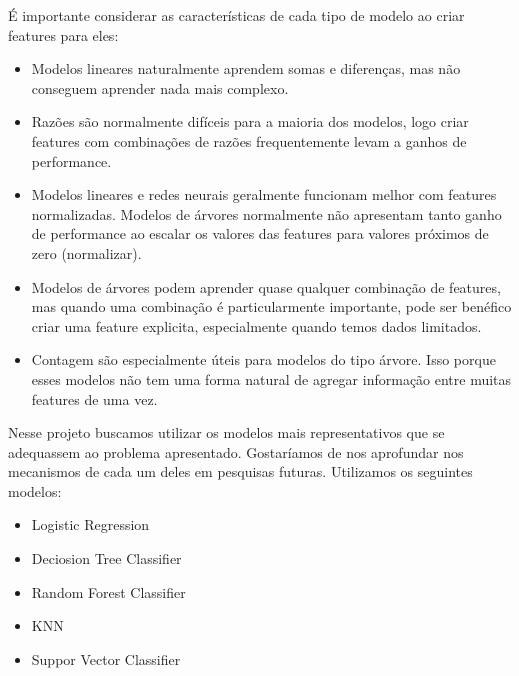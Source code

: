 É importante considerar as características de cada tipo de modelo ao criar features para eles:
\begin{itemize}
\item Modelos lineares naturalmente aprendem somas e diferenças, mas não conseguem aprender nada mais complexo.
\item Razões são normalmente difíceis para a maioria dos modelos, logo criar features com combinações de razões frequentemente levam a ganhos de performance.
\item Modelos lineares e redes neurais geralmente funcionam melhor com features normalizadas. Modelos de árvores normalmente não apresentam tanto ganho de performance ao escalar os valores das features para valores próximos de zero (normalizar).
\item Modelos de árvores podem aprender quase qualquer combinação de features, mas quando uma combinação é particularmente importante, pode ser benéfico criar uma feature explicita, especialmente quando temos dados limitados.
\item Contagem são especialmente úteis para modelos do tipo árvore. Isso porque esses modelos não tem uma forma natural de agregar informação entre muitas features de uma vez.
\end{itemize}

Nesse projeto buscamos utilizar os modelos mais representativos que se adequassem ao problema apresentado\cite{vanderplas2016python,aurelien2017hands}. Gostaríamos de nos aprofundar nos mecanismos de cada um deles em pesquisas futuras. Utilizamos os seguintes modelos:
\begin{itemize}
\item Logistic Regression
\item Deciosion Tree Classifier
\item Random Forest Classifier
\item KNN
\item Suppor Vector Classifier
\end{itemize}


